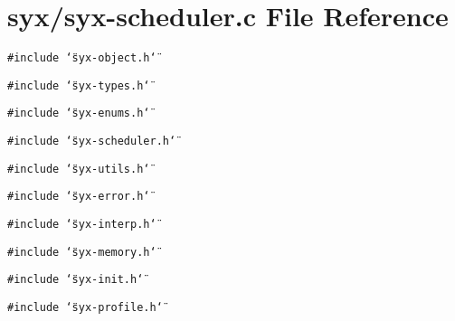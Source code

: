 \hypertarget{syx-scheduler_8c}{
\section{syx/syx-scheduler.c File Reference}
\label{syx-scheduler_8c}
}
{\tt \#include \char`\"{}syx-object.h\char`\"{}}\par
{\tt \#include \char`\"{}syx-types.h\char`\"{}}\par
{\tt \#include \char`\"{}syx-enums.h\char`\"{}}\par
{\tt \#include \char`\"{}syx-scheduler.h\char`\"{}}\par
{\tt \#include \char`\"{}syx-utils.h\char`\"{}}\par
{\tt \#include \char`\"{}syx-error.h\char`\"{}}\par
{\tt \#include \char`\"{}syx-interp.h\char`\"{}}\par
{\tt \#include \char`\"{}syx-memory.h\char`\"{}}\par
{\tt \#include \char`\"{}syx-init.h\char`\"{}}\par
{\tt \#include \char`\"{}syx-profile.h\char`\"{}}\par
